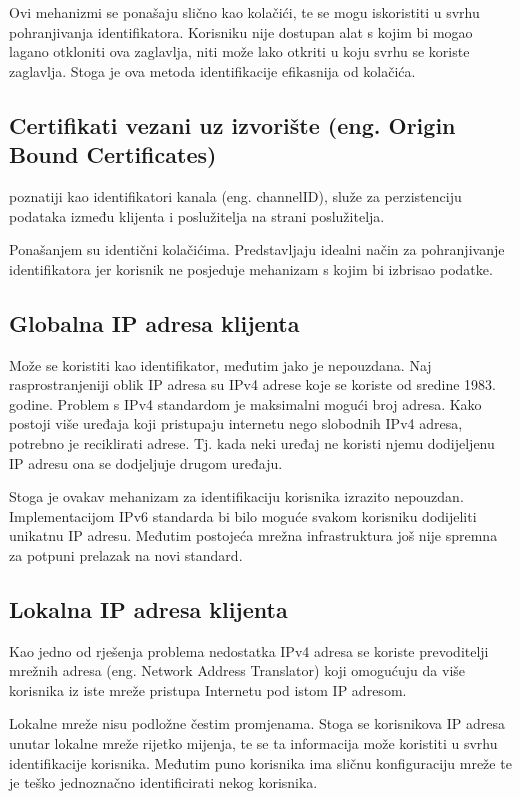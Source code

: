 \documentclass[times, utf8, zavrsni]{fer}
\begin{document}
Ovi mehanizmi se ponašaju slično kao kolačići, te se mogu iskoristiti u
svrhu pohranjivanja identifikatora. Korisniku nije dostupan alat s kojim bi
mogao lagano otkloniti ova zaglavlja, niti može lako otkriti u koju svrhu se
koriste zaglavlja. Stoga je ova metoda identifikacije efikasnija od
kolačića.

\subsection{Certifikati vezani uz izvorište (eng. Origin Bound Certificates)}
poznatiji kao identifikatori kanala (eng. channelID), služe
za perzistenciju podataka između klijenta i poslužitelja na strani
poslužitelja.

Ponašanjem su identični kolačićima. Predstavljaju idealni način za
pohranjivanje identifikatora jer korisnik ne posjeduje mehanizam s kojim bi
izbrisao podatke.

\subsection{Globalna IP adresa klijenta}
Može se koristiti kao identifikator, međutim jako je nepouzdana. Naj
rasprostranjeniji oblik IP adresa su IPv4 adrese koje se koriste od sredine
1983. godine. Problem s IPv4 standardom je maksimalni mogući broj adresa. Kako
postoji više uređaja koji pristupaju internetu nego slobodnih IPv4 adresa,
potrebno je reciklirati adrese. Tj. kada neki uređaj ne koristi njemu
dodijeljenu IP adresu ona se dodjeljuje drugom uređaju.

Stoga je ovakav mehanizam za identifikaciju korisnika izrazito nepouzdan.
Implementacijom IPv6 standarda bi bilo moguće svakom korisniku dodijeliti
unikatnu IP adresu. Međutim postojeća mrežna infrastruktura još nije spremna
za potpuni prelazak na novi standard.

\subsection{Lokalna IP adresa klijenta}
Kao jedno od rješenja problema
nedostatka IPv4 adresa se koriste prevoditelji mrežnih adresa (eng.
Network Address Translator) koji omogućuju da više korisnika iz iste mreže
pristupa Internetu pod istom IP adresom.

Lokalne mreže nisu podložne čestim promjenama. Stoga se korisnikova IP
adresa unutar lokalne mreže rijetko mijenja, te se ta informacija može
koristiti u svrhu identifikacije korisnika. Međutim puno korisnika ima
sličnu konfiguraciju mreže te je teško jednoznačno identificirati nekog
korisnika.
\end{document}
